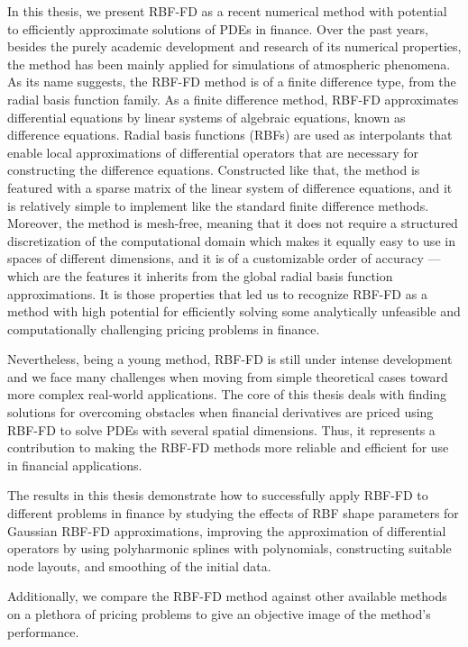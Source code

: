 \documentclass{UUThesisTemplate}
\begin{document}
{\par
In this thesis, we present RBF-FD as a recent numerical method with potential to efficiently approximate solutions of PDEs in finance. Over the past years, besides the purely academic development and research of its numerical properties, the method has been mainly applied for simulations of atmospheric phenomena. As its name suggests, the RBF-FD method is of a finite difference type, from the radial basis function family. As a finite difference method, RBF-FD approximates differential equations by linear systems of algebraic equations, known as difference equations. Radial basis functions (RBFs) are used as interpolants that enable local approximations of differential operators that are necessary for constructing the difference equations. Constructed like that, the method is featured with a sparse matrix of the linear system of difference equations, and it is relatively simple to implement like the standard finite difference methods. Moreover, the method is mesh-free, meaning that it does not require a structured discretization of the computational domain which makes it equally easy to use in spaces of different dimensions, and it is of a customizable order of accuracy --- which are the features it inherits from the global radial basis function approximations. It is those properties that led us to recognize RBF-FD as a method with high potential for efficiently solving some analytically unfeasible and computationally challenging pricing problems in finance.

\par
Nevertheless, being a young method, RBF-FD is still under intense development and we face many challenges when moving from simple theoretical cases toward more complex real-world applications. The core of this thesis deals with finding solutions for overcoming obstacles when financial derivatives are priced using RBF-FD to solve PDEs with several spatial dimensions. Thus, it represents a contribution to making the RBF-FD methods more reliable and efficient for use in financial applications. 

\par
The results in this thesis demonstrate how to successfully apply RBF-FD to different problems in finance by studying the effects of RBF shape parameters for Gaussian RBF-FD approximations, improving the approximation of differential operators by using polyharmonic splines with polynomials, constructing suitable node layouts, and smoothing of the initial data.

\par
Additionally, we compare the RBF-FD method against other available methods on a plethora of pricing problems to give an objective image of the method's performance.
}
\end{document}
